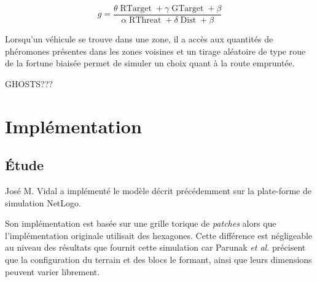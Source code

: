 \documentclass[12pt]{article}
\begin{document}
\begin{equation}
  g = \frac{ \theta \operatorname{RTarget} + \gamma
  \operatorname{GTarget} + \beta}{\alpha \operatorname{RThreat} + \delta
  \operatorname{Dist} + \beta}
  \label{g}
\end{equation}

Lorsqu'un véhicule se trouve dans une zone, il a accès aux quantités
de phéromones présentes dans les zones voisines et un tirage aléatoire
de type roue de la fortune biaisée permet de simuler un choix quant à
la route empruntée.

GHOSTS???

\section{Implémentation}

\subsection{\'Etude}

José M. Vidal a implémenté le modèle décrit précédemment sur la
plate-forme de simulation NetLogo.

Son implémentation est basée sur une grille torique de
\textit{patches} alors que l'implémentation originale utilisait des
hexagones. Cette différence est négligeable au niveau des résultats
que fournit cette simulation car Parunak \textit{et al.} précisent que
la configuration du terrain et des blocs le formant, ainsi que leurs
dimensions peuvent varier librement.
\end{document}
